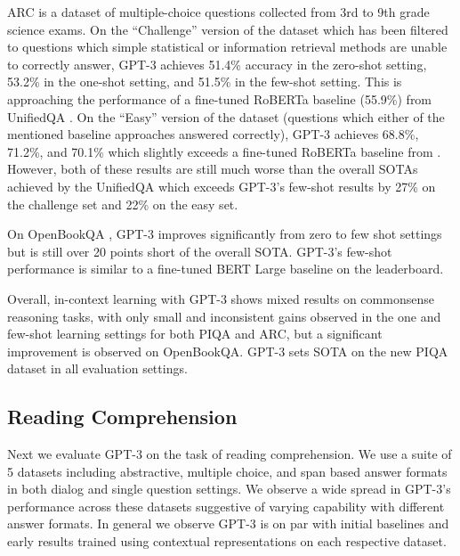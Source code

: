 ARC \cite{Clark2018ThinkYH} is a dataset of multiple-choice questions collected from 3rd to 9th grade science exams. On the ``Challenge'' version of the dataset which has been filtered to questions which simple statistical or information retrieval methods are unable to  correctly answer, GPT-3 achieves 51.4\% accuracy in the zero-shot setting, 53.2\% in the one-shot setting, and 51.5\% in the few-shot setting. This is approaching the performance of a fine-tuned RoBERTa baseline (55.9\%) from UnifiedQA \cite{khashabi2020unifiedqa}. On the ``Easy'' version of the dataset (questions which either of the mentioned baseline approaches answered correctly), GPT-3 achieves 68.8\%, 71.2\%, and 70.1\% which slightly exceeds a fine-tuned RoBERTa baseline from \cite{khashabi2020unifiedqa}. However, both of these results are still much worse than the overall SOTAs achieved by the UnifiedQA which exceeds GPT-3’s few-shot results by 27\% on the challenge set and 22\% on the easy set.

On OpenBookQA \cite{Mihaylov2018CanAS}, GPT-3 improves significantly from zero to few shot settings but is still over 20 points short of the overall SOTA. GPT-3's few-shot performance is similar to a fine-tuned BERT Large baseline on the leaderboard.

Overall, in-context learning with GPT-3 shows mixed results on commonsense reasoning tasks, with only small and inconsistent gains observed in the one and few-shot learning settings for both PIQA and ARC, but a significant improvement is observed on OpenBookQA. GPT-3 sets SOTA on the new PIQA dataset in all evaluation settings.

    \subsection{Reading Comprehension}
    \label{section:Reading_Comprehension}

Next we evaluate GPT-3 on the task of reading comprehension. We use a suite of 5 datasets including abstractive, multiple choice, and span based answer formats in both dialog and single question settings. We observe a wide spread in GPT-3's performance across these datasets suggestive of varying capability with different answer formats. In general we observe GPT-3 is on par with initial baselines and early results trained using contextual representations on each respective dataset.

